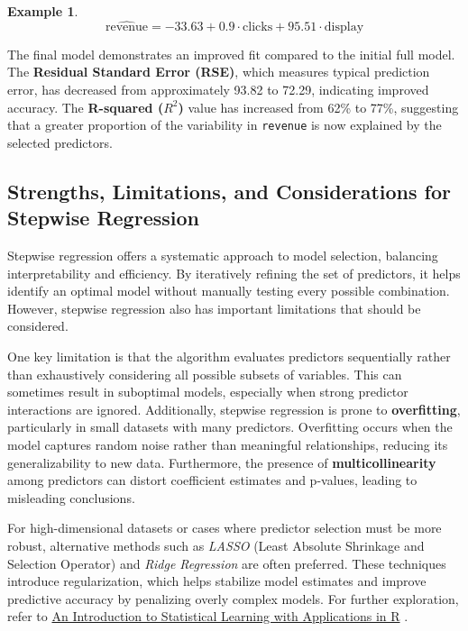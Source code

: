 \documentclass[
]{book}
\newcommand{\passthrough}[1]{#1}
\theoremstyle{definition}
\theoremstyle{definition}
\newtheorem{example}{Example}[chapter]
\theoremstyle{definition}
\theoremstyle{definition}
\theoremstyle{remark}
\begin{document}
\begin{example}
\[
\hat{\text{revenue}} = -33.63 + 0.9 \cdot \text{clicks} + 95.51 \cdot \text{display}
\]

The final model demonstrates an improved fit compared to the initial full model. The \textbf{Residual Standard Error (RSE)}, which measures typical prediction error, has decreased from approximately 93.82 to 72.29, indicating improved accuracy. The \textbf{R-squared (\(R^2\))} value has increased from 62\% to 77\%, suggesting that a greater proportion of the variability in \passthrough{\lstinline!revenue!} is now explained by the selected predictors.
\end{example}

\subsection*{Strengths, Limitations, and Considerations for Stepwise Regression}\label{strengths-limitations-and-considerations-for-stepwise-regression}

Stepwise regression offers a systematic approach to model selection, balancing interpretability and efficiency. By iteratively refining the set of predictors, it helps identify an optimal model without manually testing every possible combination. However, stepwise regression also has important limitations that should be considered.

One key limitation is that the algorithm evaluates predictors sequentially rather than exhaustively considering all possible subsets of variables. This can sometimes result in suboptimal models, especially when strong predictor interactions are ignored. Additionally, stepwise regression is prone to \textbf{overfitting}, particularly in small datasets with many predictors. Overfitting occurs when the model captures random noise rather than meaningful relationships, reducing its generalizability to new data. Furthermore, the presence of \textbf{multicollinearity} among predictors can distort coefficient estimates and p-values, leading to misleading conclusions.

For high-dimensional datasets or cases where predictor selection must be more robust, alternative methods such as \emph{LASSO} (Least Absolute Shrinkage and Selection Operator) and \emph{Ridge Regression} are often preferred. These techniques introduce regularization, which helps stabilize model estimates and improve predictive accuracy by penalizing overly complex models. For further exploration, refer to \href{https://www.statlearning.com}{An Introduction to Statistical Learning with Applications in R} \citep{gareth2013introduction}.
\end{document}
